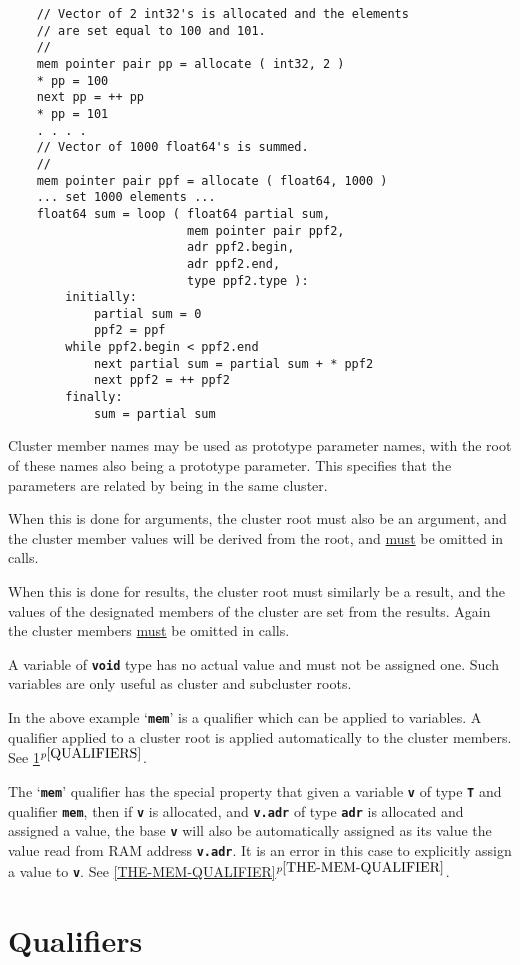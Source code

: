 \documentclass[12pt]{article}
\newcommand{\TT}[1]{{\tt \bfseries #1}}
\newcommand{\itemref}[1]{\ref{#1}$^{p\pageref{#1}}$}
\newenvironment{indpar}[1][0.3in]%
	{\begin{list}{}%
		     {\setlength{\itemsep}{0in}%
		      \setlength{\topsep}{0in}%
		      \setlength{\parsep}{1ex}%
		      \setlength{\labelwidth}{#1}%
		      \setlength{\leftmargin}{#1}%
		      \addtolength{\leftmargin}{\labelsep}}%
	 \item}%
	{\end{list}}
\begin{document}
\begin{indpar}
\begin{verbatim}
    // Vector of 2 int32's is allocated and the elements
    // are set equal to 100 and 101.
    //
    mem pointer pair pp = allocate ( int32, 2 )
    * pp = 100
    next pp = ++ pp
    * pp = 101
    . . . .
    // Vector of 1000 float64's is summed.
    //
    mem pointer pair ppf = allocate ( float64, 1000 )
    ... set 1000 elements ...
    float64 sum = loop ( float64 partial sum,
                         mem pointer pair ppf2,
                         adr ppf2.begin,
                         adr ppf2.end,
                         type ppf2.type ):
        initially:
            partial sum = 0
            ppf2 = ppf
        while ppf2.begin < ppf2.end
            next partial sum = partial sum + * ppf2
            next ppf2 = ++ ppf2
        finally:
            sum = partial sum
\end{verbatim}\end{indpar}

Cluster member names may be used as prototype parameter
names, with the root of these names also being a prototype
parameter.  This specifies that the parameters are related
by being in the same cluster.

When this is done for arguments, the cluster root must
also be an argument, and the cluster member values
will be derived from the root, and \underline{must}
be omitted in calls.

When this is done for results, the cluster root must similarly
be a result, and the values of the designated
members of the cluster are set from the results.
Again the cluster members \underline{must} be omitted in calls.

A variable of \TT{void} type has no actual value
and must not be assigned one.  Such variables are only useful
as cluster and subcluster roots.

In the above example `\TT{mem}' is a qualifier
which can be applied to variables.
A qualifier applied to a cluster root is applied automatically
to the cluster members.  See \itemref{QUALIFIERS}.

The `\TT{mem}' qualifier has the special property that given a variable
\TT{v} of type \TT{T} and qualifier \TT{mem}, then if \TT{v} is allocated,
and \TT{v.adr} of type \TT{adr} is allocated and
assigned a value, the base \TT{v} will also be automatically
assigned as its value the value read from RAM address \TT{v.adr}.
It is an error in this case to explicitly assign a value to \TT{v}.
See \itemref{THE-MEM-QUALIFIER}.

\section{Qualifiers}
\label{QUALIFIERS}
\end{document}
